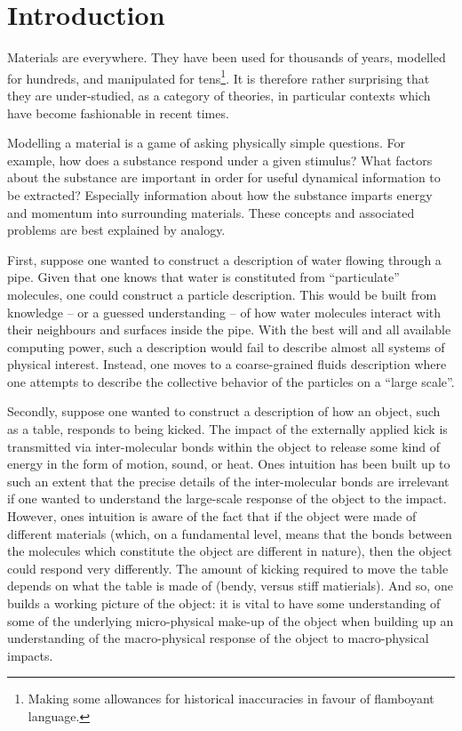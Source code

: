 \section{Introduction}
Materials are everywhere. They have been used for thousands of years, modelled for hundreds, and manipulated for tens\footnote{Making some allowances for historical inaccuracies in favour of flamboyant language.}. It is therefore rather surprising that they are    under-studied, as a category of theories, in particular contexts which have become   fashionable in recent times. 



Modelling a material is a game of asking   physically simple questions. For example, how does  a substance respond under a given stimulus? What factors about the substance are important in order for useful dynamical information to be extracted? Especially information about how the substance imparts energy and momentum into surrounding materials. These concepts and associated problems are best explained by analogy.


First, suppose one wanted to construct a description of water flowing through a pipe. Given that one knows that water is constituted from ``particulate'' molecules,  one could construct a particle description. This would be built from knowledge -- or a guessed understanding -- of how water molecules interact with their neighbours and surfaces inside the pipe. With the best will and all available computing power, such a description would fail to describe almost all systems of physical interest. Instead, one moves to a coarse-grained fluids description where one attempts to describe the collective behavior of the particles on a ``large scale''.  

Secondly, suppose one wanted to construct a description of how an object, such as a table, responds to being kicked. The impact of the externally applied kick is transmitted via inter-molecular bonds within the object to release some kind of energy in the form of motion, sound, or heat.  Ones intuition has been built up to such an extent that the precise details of the inter-molecular bonds are irrelevant if one wanted to understand the large-scale response of the object to the impact. However, ones intuition is   aware of the fact that if the object were made of different materials (which, on a fundamental level, means that the   bonds between the molecules which constitute the object are  different in nature), then the object could respond very differently. The amount of kicking required to move the table depends on what the table is made of (bendy, versus stiff matierials). And so, one builds a working picture of the object: it is vital to have some understanding of some of the underlying micro-physical make-up of the object when building up an understanding of the macro-physical response of the object to macro-physical impacts.  



